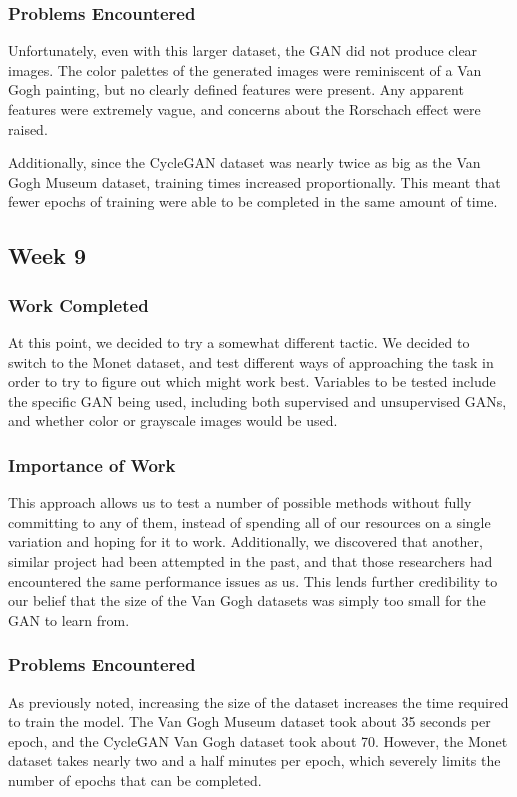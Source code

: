 \documentclass[11pt,letterpaper]{article}
\begin{document}
			\subsubsection{Problems Encountered}
				Unfortunately, even with this larger dataset, the GAN did not produce clear images.
				The color palettes of the generated images were reminiscent of a Van Gogh painting, but no clearly defined features were present.
				Any apparent features were extremely vague, and concerns about the Rorschach effect were raised.

				Additionally, since the CycleGAN dataset was nearly twice as big as the Van Gogh Museum dataset, training times increased proportionally.
				This meant that fewer epochs of training were able to be completed in the same amount of time.

		\subsection{Week 9}
			\subsubsection{Work Completed}
				At this point, we decided to try a somewhat different tactic.
				We decided to switch to the Monet dataset, and test different ways of approaching the task in order to try to figure out which might work best.
				Variables to be tested include the specific GAN being used, including both supervised and unsupervised GANs, and whether color or grayscale images would be used.
			\subsubsection{Importance of Work}
				This approach allows us to test a number of possible methods without fully committing to any of them, instead of spending all of our resources on a single variation and hoping for it to work.
				Additionally, we discovered that another, similar project had been attempted in the past\cite{otherGanGogh}, and that those researchers had encountered the same performance issues as us.
				This lends further credibility to our belief that the size of the Van Gogh datasets was simply too small for the GAN to learn from.
			\subsubsection{Problems Encountered}
				As previously noted, increasing the size of the dataset increases the time required to train the model.
				The Van Gogh Museum dataset took about 35 seconds per epoch, and the CycleGAN Van Gogh dataset took about 70.
				However, the Monet dataset takes nearly two and a half minutes per epoch, which severely limits the number of epochs that can be completed.
\end{document}
